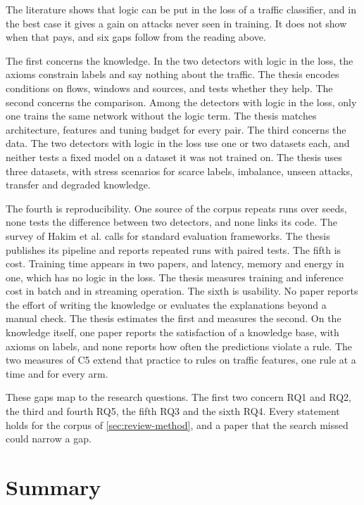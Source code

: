 The literature shows that logic can be put in the loss of a traffic classifier,
and in the best case it gives a gain on attacks never seen in training. It
does not show when that pays, and six gaps follow from the reading above.

The first concerns the knowledge. In the two detectors with logic in the loss,
the axioms constrain labels and say nothing about the traffic. The thesis
encodes conditions on flows, windows and sources, and tests whether they help.
The second concerns the comparison. Among the detectors with logic in the
loss, only one trains the same network without the logic term. The thesis
matches architecture, features and tuning budget for every pair. The third
concerns the data. The two detectors with logic in the loss use one or two
datasets each, and neither tests a fixed model on a dataset it was not trained
on. The thesis uses three datasets, with stress scenarios for scarce
labels, imbalance, unseen attacks, transfer and degraded knowledge.

The fourth is reproducibility. One source of the corpus repeats runs over seeds,
none tests the difference between two detectors, and none links its code. The
survey of Hakim et al. calls for standard evaluation frameworks. The thesis
publishes its pipeline and reports repeated runs with paired tests. The fifth is
cost. Training time appears in two papers, and latency, memory and energy in
one, which has no logic in the loss.
The thesis measures training and inference cost in batch and in streaming
operation. The sixth is usability. No paper reports the effort of writing the
knowledge or evaluates the explanations beyond a manual check. The thesis
estimates the first and measures the second. On the knowledge itself, one paper reports the satisfaction of a
knowledge base, with axioms on labels, and none reports how often the predictions
violate a rule. The two measures of C5 extend that practice to rules on traffic
features, one rule at a time and for every arm.

These gaps map to the research questions. The first two concern RQ1 and RQ2,
the third and fourth RQ5, the fifth RQ3 and the sixth RQ4. Every statement
holds for the corpus of \cref{sec:review-method}, and a paper that the search
missed could narrow a gap.

\section{Summary}
\label{sec:ch6-summary}

